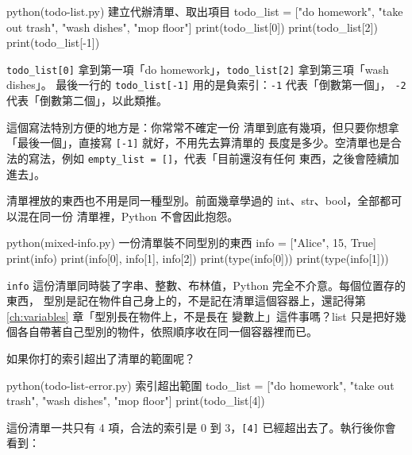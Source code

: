 \begin{example}{python}{(todo-list.py) 建立代辦清單、取出項目}
todo_list = ["do homework", "take out trash", "wash dishes", "mop floor"]
print(todo_list[0])
print(todo_list[2])
print(todo_list[-1])
\end{example}


\texttt{todo\_list[0]} 拿到第一項「do homework」，\texttt{todo\_list[2]} 拿到第三項「wash dishes」。
最後一行的 \texttt{todo\_list[-1]} 用的是負索引：\texttt{-1} 代表「倒數第一個」，
\texttt{-2} 代表「倒數第二個」，以此類推。

這個寫法特別方便的地方是：你常常不確定一份
清單到底有幾項，但只要你想拿「最後一個」，直接寫 \texttt{[-1]} 就好，不用先去算清單的
長度是多少。空清單也是合法的寫法，例如 \texttt{empty\_list = []}，代表「目前還沒有任何
東西，之後會陸續加進去」。

清單裡放的東西也不用是同一種型別。前面幾章學過的 int、str、bool，全部都可以混在同一份
清單裡，Python 不會因此抱怨。

\begin{example}{python}{(mixed-info.py) 一份清單裝不同型別的東西}
info = ["Alice", 15, True]
print(info)
print(info[0], info[1], info[2])
print(type(info[0]))
print(type(info[1]))
\end{example}


\texttt{info} 這份清單同時裝了字串、整數、布林值，Python 完全不介意。每個位置存的東西，
型別是記在物件自己身上的，不是記在清單這個容器上，還記得第 \ref{ch:variables} 章「型別長在物件上，不是長在
變數上」這件事嗎？list 只是把好幾個各自帶著自己型別的物件，依照順序收在同一個容器裡而已。

如果你打的索引超出了清單的範圍呢？

\begin{example}{python}{(todo-list-error.py) 索引超出範圍}
todo_list = ["do homework", "take out trash", "wash dishes", "mop floor"]
print(todo_list[4])
\end{example}

這份清單一共只有 4 項，合法的索引是 0 到 3，\texttt{[4]} 已經超出去了。執行後你會看到：


